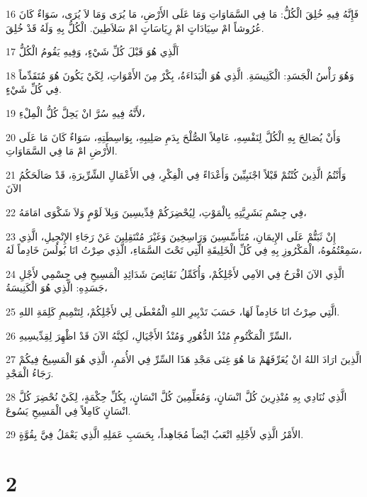 \par 16 فَإِنَّهُ فِيهِ خُلِقَ الْكُلُّ: مَا فِي السَّمَاوَاتِ وَمَا عَلَى الأَرْضِ، مَا يُرَى وَمَا لاَ يُرَى، سَوَاءٌ كَانَ عُرُوشاً امْ سِيَادَاتٍ امْ رِيَاسَاتٍ امْ سَلاَطِينَ. الْكُلُّ بِهِ وَلَهُ قَدْ خُلِقَ.
\par 17 اَلَّذِي هُوَ قَبْلَ كُلِّ شَيْءٍ، وَفِيهِ يَقُومُ الْكُلُّ
\par 18 وَهُوَ رَأْسُ الْجَسَدِ: الْكَنِيسَةِ. الَّذِي هُوَ الْبَدَاءَةُ، بِكْرٌ مِنَ الأَمْوَاتِ، لِكَيْ يَكُونَ هُوَ مُتَقَدِّماً فِي كُلِّ شَيْءٍ.
\par 19 لأَنَّهُ فِيهِ سُرَّ انْ يَحِلَّ كُلُّ الْمِلْءِ،
\par 20 وَأَنْ يُصَالِحَ بِهِ الْكُلَّ لِنَفْسِهِ، عَامِلاً الصُّلْحَ بِدَمِ صَلِيبِهِ، بِوَاسِطَتِهِ، سَوَاءٌ كَانَ مَا عَلَى الأَرْضِ امْ مَا فِي السَّمَاوَاتِ.
\par 21 وَأَنْتُمُ الَّذِينَ كُنْتُمْ قَبْلاً اجْنَبِيِّينَ وَأَعْدَاءً فِي الْفِكْرِ، فِي الأَعْمَالِ الشِّرِّيرَةِ، قَدْ صَالَحَكُمُ الآنَ
\par 22 فِي جِسْمِ بَشَرِيَّتِهِ بِالْمَوْتِ، لِيُحْضِرَكُمْ قِدِّيسِينَ وَبِلاَ لَوْمٍ وَلاَ شَكْوَى امَامَهُ،
\par 23 إِنْ ثَبَتُّمْ عَلَى الإِيمَانِ، مُتَأَسِّسِينَ وَرَاسِخِينَ وَغَيْرَ مُنْتَقِلِينَ عَنْ رَجَاءِ الإِنْجِيلِ، الَّذِي سَمِعْتُمُوهُ، الْمَكْرُوزِ بِهِ فِي كُلِّ الْخَلِيقَةِ الَّتِي تَحْتَ السَّمَاءِ، الَّذِي صِرْتُ انَا بُولُسَ خَادِماً لَهُ،
\par 24 الَّذِي الآنَ افْرَحُ فِي الاَمِي لأَجْلِكُمْ، وَأُكَمِّلُ نَقَائِصَ شَدَائِدِ الْمَسِيحِ فِي جِسْمِي لأَجْلِ جَسَدِهِ: الَّذِي هُوَ الْكَنِيسَةُ،
\par 25 الَّتِي صِرْتُ انَا خَادِماً لَهَا، حَسَبَ تَدْبِيرِ اللهِ الْمُعْطَى لِي لأَجْلِكُمْ، لِتَتْمِيمِ كَلِمَةِ اللهِ.
\par 26 السِّرِّ الْمَكْتُومِ مُنْذُ الدُّهُورِ وَمُنْذُ الأَجْيَالِ، لَكِنَّهُ الآنَ قَدْ اظْهِرَ لِقِدِّيسِيهِ،
\par 27 الَّذِينَ ارَادَ اللهُ انْ يُعَرِّفَهُمْ مَا هُوَ غِنَى مَجْدِ هَذَا السِّرِّ فِي الأُمَمِ، الَّذِي هُوَ الْمَسِيحُ فِيكُمْ رَجَاءُ الْمَجْدِ.
\par 28 الَّذِي نُنَادِي بِهِ مُنْذِرِينَ كُلَّ انْسَانٍ، وَمُعَلِّمِينَ كُلَّ انْسَانٍ، بِكُلِّ حِكْمَةٍ، لِكَيْ نُحْضِرَ كُلَّ انْسَانٍ كَامِلاً فِي الْمَسِيحِ يَسُوعَ.
\par 29 الأَمْرُ الَّذِي لأَجْلِهِ اتْعَبُ ايْضاً مُجَاهِداً، بِحَسَبِ عَمَلِهِ الَّذِي يَعْمَلُ فِيَّ بِقُوَّةٍ.

\chapter{2}

